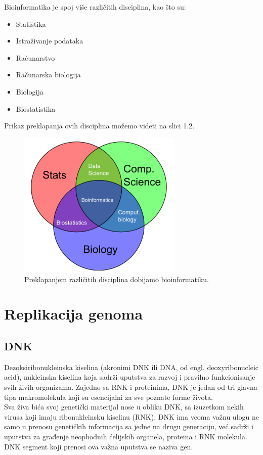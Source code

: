 Bioinformatika je spoj više različitih disciplina, kao što su:
\begin{itemize}
	\item Statistika
	\item Istraživanje podataka	
	\item Računarstvo
	\item Računarska biologija
	\item Biologija
	\item Biostatistika
\end{itemize}
Prikaz preklapanja ovih disciplina možemo videti na slici 1.2.
\begin{figure}[h]
\caption{Preklapanjem različitih disciplina dobijamo bioinformatiku.}
\centering
\includegraphics[width=0.7\textwidth]{poglavlja/1/slike/Multidisciplinarnost.png}
\end{figure}  

\newpage

\section{Replikacija genoma}
\label{sec:replikacija}

\subsection{DNK}

Dezoksiribonukleinska kiselina (akronimi DNK ili DNA, od engl. deoxyribonucleic acid), nukleinska kiselina koja sadrži uputstva za razvoj i pravilno funkcionisanje svih živih organizama. Zajedno sa RNK i proteinima, DNK je jedan od tri glavna tipa makromolekula koji su esencijalni za sve poznate forme života. \\
Sva živa bića svoj genetički materijal nose u obliku DNK, sa izuzetkom nekih virusa koji imaju ribonukleinsku kiselinu (RNK). DNK ima veoma važnu ulogu ne samo u prenosu genetičkih informacija sa jedne na drugu generaciju, već sadrži i uputstva za građenje neophodnih ćelijskih organela, proteina i RNK molekula. DNK segment koji prenosi ova važna uputstva se naziva gen.\\\\

